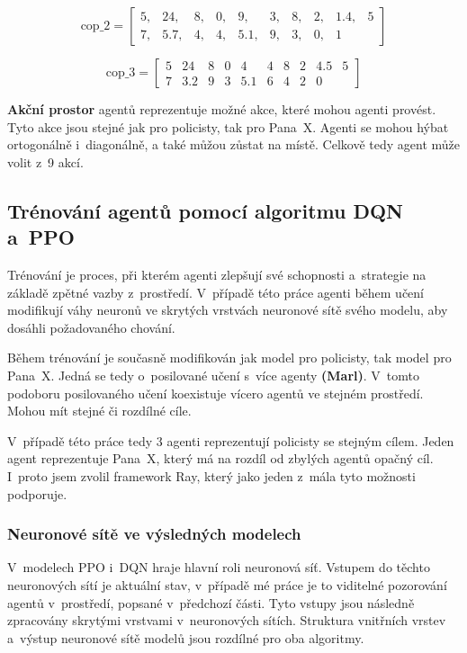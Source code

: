 \[
\text{cop\_2} = \begin{bmatrix}
5, & 24, & 8, & 0, & 9, & 3, & 8, & 2, & 1.4, & 5 \\
7, & 5.7, & 4, & 4, & 5.1, & 9, & 3, & 0, & 1
\end{bmatrix}
\]

\[
\text{cop\_3} = \begin{bmatrix}
5 & 24 & 8 & 0 & 4 & 4 & 8 & 2 & 4.5 & 5 \\
7 & 3.2 & 9 & 3 & 5.1 & 6 & 4 & 2 & 0
\end{bmatrix}
\]

\bigskip

\textbf{Akční prostor} agentů reprezentuje možné akce, které mohou agenti provést.
Tyto akce jsou stejné jak pro policisty, tak pro Pana~X\@.
Agenti se mohou hýbat ortogonálně i~diagonálně, a také můžou zůstat na místě.
Celkově tedy agent může volit z~9 akcí.

\subsection{Trénování agentů pomocí algoritmu DQN a~PPO}
Trénování je proces, při kterém agenti zlepšují své schopnosti a~strategie na základě zpětné vazby z~prostředí.
V~případě této práce agenti během učení modifikují váhy neuronů ve skrytých vrstvách neuronové sítě svého modelu, aby dosáhli požadovaného chování.

Během trénování je současně modifikován jak model pro policisty, tak model pro Pana~X\@.
Jedná se tedy o~posilované učení s~více agenty \textbf{(Marl)}.
V~tomto podoboru posilovaného učení koexistuje vícero agentů ve stejném prostředí.
Mohou mít stejné či rozdílné cíle.

V~případě této práce tedy 3 agenti reprezentují policisty se stejným cílem.
Jeden agent reprezentuje Pana~X, který má na rozdíl od zbylých agentů opačný cíl.
I~proto jsem zvolil framework Ray, který jako jeden z~mála tyto možnosti podporuje.

\subsubsection{Neuronové sítě ve výsledných modelech}
\label{subsec:neuronove_site}
V~modelech PPO i~DQN hraje hlavní roli neuronová síť.
Vstupem do těchto neuronových sítí je aktuální stav, v~případě mé práce je to viditelné pozorování agentů v~prostředí, popsané v~předchozí části.
Tyto vstupy jsou následně zpracovány skrytými vrstvami v~neuronových sítích.
Struktura vnitřních vrstev a~výstup neuronové sítě modelů jsou rozdílné pro oba algoritmy.
\bigskip

